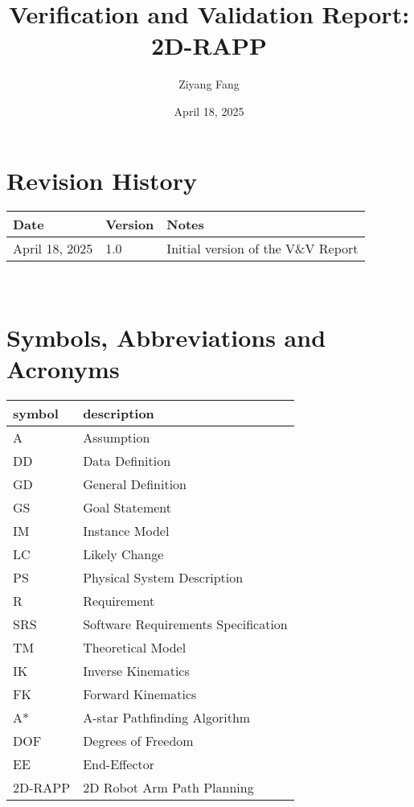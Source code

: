 \documentclass[12pt, titlepage]{article}
\begin{document}
\title{Verification and Validation Report: 2D-RAPP} 
\author{Ziyang Fang}
\date{April 18, 2025}
	
\maketitle


\section{Revision History}

\begin{tabularx}{\textwidth}{p{3cm}p{2cm}X}
\toprule {\bf Date} & {\bf Version} & {\bf Notes}\\
\midrule
April 18, 2025 & 1.0 & Initial version of the V\&V Report \\
\bottomrule
\end{tabularx}

~\newpage

\section{Symbols, Abbreviations and Acronyms}

\renewcommand{\arraystretch}{1.2}
\begin{tabular}{l l} 
    \toprule		
    \textbf{symbol} & \textbf{description}\\
    \midrule 
    A & Assumption\\
    DD & Data Definition\\
    GD & General Definition\\
    GS & Goal Statement\\
    IM & Instance Model\\
    LC & Likely Change\\
    PS & Physical System Description\\
    R & Requirement\\
    SRS & Software Requirements Specification\\
    TM & Theoretical Model\\
    IK & Inverse Kinematics \\
    FK & Forward Kinematics \\
    A* & A-star Pathfinding Algorithm \\
    DOF & Degrees of Freedom \\
    EE & End-Effector \\
    2D-RAPP & 2D Robot Arm Path Planning\\
    \bottomrule
  \end{tabular}\\
\end{document}
